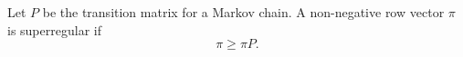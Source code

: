 Let $P$ be the transition matrix for a Markov chain. A non-negative row vector $\pi$ is superregular if
$$\pi \geq \pi P.$$
